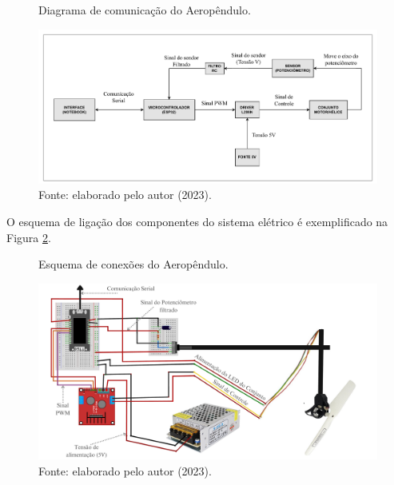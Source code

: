 \begin{figure}[!h]
	\centering
	\caption{Diagrama de comunicação do Aeropêndulo.}
	\includegraphics[width=1\textwidth, page=1]{Capitulos/3_simulacao_e_prototipo/3_figuras/diag_aerop.pdf}
	\caption*{Fonte: elaborado pelo autor (2023).}
	\label{fig3:image_11}
\end{figure}


O esquema de ligação dos componentes do sistema elétrico é exemplificado na Figura \ref{fig3:image_12}.

\begin{figure}[!h]
	\centering
	\caption{Esquema de conexões do Aeropêndulo.}
	\includegraphics[width=1.1\textwidth, page=1]{Capitulos/3_simulacao_e_prototipo/3_figuras/esquema_eletrico_aerop.pdf}
	\caption*{Fonte: elaborado pelo autor (2023).}
	\label{fig3:image_12}
\end{figure}
